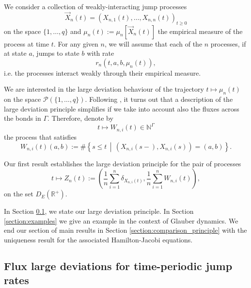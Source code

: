 \documentclass[a4paper]{article}
\newcommand{\cP}{\mathcal{P}}
\newcommand{\bN}{\mathbb{N}}
\newcommand{\bR}{\mathbb{R}}
\numberwithin{equation}{section}
\theoremstyle{definition}
\begin{document}
We consider a collection of weakly-interacting jump processes 
\begin{equation} \label{eqn:results_weakly_interacting_processes}
	\vec{X}_n(t) = (X_{n,1}(t),\dots,X_{n,n}(t))_{t \geq 0}
\end{equation}
on the space $\{1,\dots,q\}$ and $\mu_n(t) := \mu_n[\vec{X}_n(t)]$ the empirical measure of the process at time $t$. For any given $n$, we will assume that each of the $n$ processes, if at state $a$, jumps to state $b$ with rate
\begin{equation*}
	r_n(t,a,b,\mu_n(t)),
\end{equation*}
i.e. the processes interact weakly through their empirical measure.








We are interested in the large deviation behaviour of the trajectory $t \mapsto \mu_n(t)$ on the space $\cP(\{1,\dots,q\})$. Following \cite{Re18,PaRe19}, it turns out that a description of the large deviation principle simplifies if we take into account also the fluxes across the bonds in $\Gamma$. Therefore, denote by
\begin{equation*}
	t \mapsto W_{n,i}(t) \in \bN^\Gamma
\end{equation*}
the process that satisfies
\begin{equation*}
	W_{n,i}(t)(a,b) := \#\left\{s \leq t \, \middle| \, \left(X_{n,i}(s-), X_{n,i}(s)\right) = (a,b) \right\}.
\end{equation*}

Our first result establishes the large deviation principle for the pair of processes
\begin{equation} \label{eqn:main_pair_of_processes}
	t \mapsto Z_n(t) := \left(\frac{1}{n} \sum_{i=1}^n \delta_{X_{n,i}(t)},\frac{1}{n} \sum_{i=1}^n W_{n,i}(t)\right),
\end{equation}
on the set $D_E(\bR^+)$. 






In Section \ref{section:LDP_periodic}, we state our large deviation principle. In Section \ref{section:examples} we give an example in the context of Glauber dynamics.  We end our section of main results in Section \ref{section:comparison_principle} with the uniqueness result for the associated Hamilton-Jacobi equations.






\subsection{Flux large deviations for time-periodic jump rates} \label{section:LDP_periodic}
\end{document}
